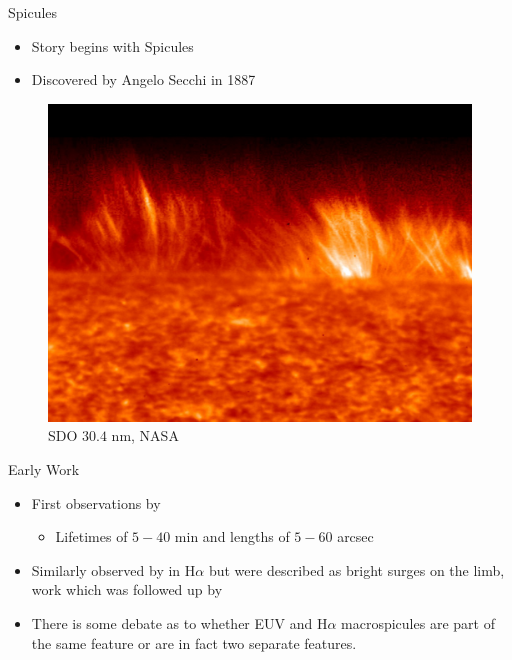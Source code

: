\documentclass{beamer}
\begin{document}
	\begin{frame}{Spicules}
		\begin{itemize}
			\item{Story begins with Spicules}
			\item{Discovered by Angelo Secchi in 1887}
		\end{itemize}
		\begin{figure}
			\includegraphics[scale=0.3]{Figs/spicules_at_limb.jpg}
			\caption{SDO $30.4$ nm, NASA}
		\end{figure}
	\end{frame}


	\begin{frame}{Early Work}
		\begin{itemize}
			\item{First observations by \cite{Bohlin1975}}
				\begin{itemize}
				\item{Lifetimes of $5 - 40$ min and lengths of $5 - 60$ arcsec}
				\end{itemize}
			\item{Similarly observed by \cite{Godoli1967} in H$\alpha$ but were described as bright surges on the limb, work which was followed up by \cite{LaBonte79}}	
			\item{There is some debate as to whether EUV and H$\alpha$ macrospicules are part of the same feature or are in fact two separate features.} 
		\end{itemize}	
	\end{frame}
\end{document}
